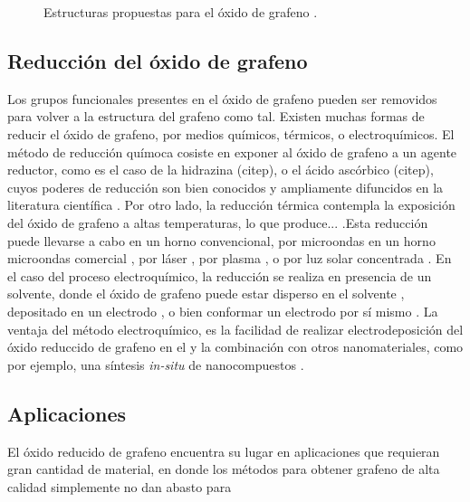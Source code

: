 \begin{figure}
	\centering
	\caption{Estructuras propuestas para el óxido de grafeno \citep{Dreyer2010}.}
	\label{fig:GO_structure}
\end{figure}


\subsection{Reducción del óxido de grafeno}
Los grupos funcionales presentes en el óxido de grafeno pueden ser removidos para volver a la estructura del grafeno como tal.
Existen muchas formas de reducir el óxido de grafeno, por medios químicos, térmicos, o electroquímicos. El método de reducción químoca cosiste en exponer al óxido de grafeno a un agente reductor, como es el caso de la hidrazina (citep), o el ácido ascórbico (citep), cuyos poderes de reducción son bien conocidos y ampliamente difuncidos en la literatura científica \citep{Chua2015}. Por otro lado, la reducción térmica contempla la exposición del óxido de grafeno a altas temperaturas, lo que produce... .Esta reducción puede llevarse a cabo en un horno convencional, por microondas en un horno microondas comercial \citep{Zhu2010a}, por láser \citep{El-Kady2013}, por plasma \citep{Lee2012}, o por luz solar concentrada \citep{Mohandoss2017}. En el caso del proceso electroquímico, la reducción se realiza en presencia de un solvente, donde el óxido de grafeno puede estar disperso en el solvente \citep{Liu2011}, depositado en un electrodo \citep{Harima2011, Toh2014}, o bien conformar un electrodo por sí mismo \citep{Feng2016}. La ventaja del método electroquímico, es la facilidad de realizar electrodeposición del óxido reduccido de grafeno en el  y la combinación con otros nanomateriales, como por ejemplo, una síntesis \emph{in-situ} de nanocompuestos \citep{Liu2011, Xie2014}.

\subsection{Aplicaciones}
El óxido reducido de grafeno encuentra su lugar en aplicaciones que requieran gran cantidad de material, en donde los métodos para obtener grafeno de alta calidad simplemente no dan abasto para




